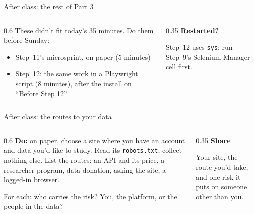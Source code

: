 \documentclass[9pt,aspectratio=169]{beamer}
\begin{document}
\begin{frame}{After class: the rest of Part 3}
    \begin{columns}[T]
        \begin{column}{0.6\textwidth}
            These didn't fit today's 35 minutes. Do them before Sunday:
            \begin{itemize}\small
                \item Step~11's microsprint, on paper (5 minutes)
                \item Step~12: the same work in a Playwright script (8 minutes), after the install on ``Before Step 12''
            \end{itemize}
        \end{column}
        \begin{column}{0.35\textwidth}
            \textbf{Restarted?}\\[2pt]
            {\footnotesize Step~12 uses \texttt{sys}: run Step~9's Selenium Manager cell first.\par}
        \end{column}
    \end{columns}
\end{frame}

\begin{frame}{After class: the routes to your data}
    \begin{columns}[T]
        \begin{column}{0.6\textwidth}
            \textbf{Do:} on paper, choose a site where you have an account and data you'd like to study. Read its \texttt{robots.txt}; collect nothing else. List the routes: an API and its price, a researcher program, data donation, asking the site, a logged-in browser.

            \medskip
            For each: who carries the risk? You, the platform, or the people in the data?
        \end{column}
        \begin{column}{0.35\textwidth}
            \textbf{Share}\\[2pt]
            {\footnotesize Your site, the route you'd take, and one risk it puts on someone other than you.\par}
        \end{column}
    \end{columns}
\end{frame}
\end{document}
